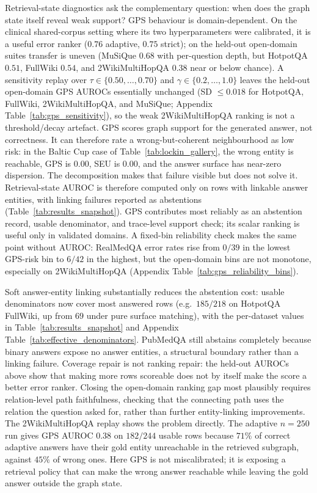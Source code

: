 Retrieval-state diagnostics ask the complementary question: when does the graph
state itself reveal weak support?
GPS behaviour is domain-dependent.
On the clinical shared-corpus setting where its two hyperparameters were
calibrated, it is a useful error ranker ($0.76$ adaptive, $0.75$
strict); on the held-out open-domain suites transfer is uneven (MuSiQue $0.68$
with per-question depth, but HotpotQA $0.51$, FullWiki $0.54$, and
2WikiMultiHopQA $0.38$ near or below chance).
A sensitivity replay over $\tau\in\{0.50,\ldots,0.70\}$ and
$\gamma\in\{0.2,\ldots,1.0\}$ leaves the held-out open-domain GPS AUROCs
essentially unchanged (SD $\leq 0.018$ for HotpotQA, FullWiki,
2WikiMultiHopQA, and MuSiQue; Appendix Table~\ref{tab:gps_sensitivity}), so
the weak 2WikiMultiHopQA ranking is not a threshold/decay artefact.
GPS scores graph support for the generated answer, not correctness.
It can therefore rate a wrong-but-coherent neighbourhood as low risk: in the
Baltic Cup case of Table~\ref{tab:lockin_gallery}, the wrong entity is reachable,
GPS is $0.00$, SEU is $0.00$, and the answer surface has near-zero dispersion.
The decomposition makes that failure visible but does not solve it.
Retrieval-state AUROC is therefore computed only on rows with linkable answer
entities, with linking failures reported as abstentions
(Table~\ref{tab:results_snapshot}). GPS contributes most reliably as an
abstention record, usable denominator, and trace-level support check; its scalar
ranking is useful only in validated domains.
A fixed-bin reliability check makes the same point without AUROC:
RealMedQA error rates rise from $0/39$ in the lowest GPS-risk bin to $6/42$
in the highest, but the open-domain bins are not monotone, especially on
2WikiMultiHopQA (Appendix Table~\ref{tab:gps_reliability_bins}).

Soft answer-entity linking substantially reduces the abstention cost: usable
denominators now cover most answered rows (e.g.\ $185/218$ on HotpotQA
FullWiki, up from $69$ under pure surface matching), with the per-dataset
values in Table~\ref{tab:results_snapshot} and Appendix
Table~\ref{tab:effective_denominators}.
PubMedQA still abstains completely because binary answers expose no answer
entities, a structural boundary rather than a linking failure.
Coverage repair is not ranking repair: the held-out AUROCs above
show that making more rows scoreable does not by itself make the score a
better error ranker.
Closing the open-domain ranking gap most plausibly requires relation-level
path faithfulness, checking that the connecting path uses the relation the
question asked for, rather than further entity-linking improvements.
The 2WikiMultiHopQA replay shows the problem directly.
The adaptive $n=250$ run gives GPS AUROC $0.38$ on $182/244$ usable rows because
$71\%$ of correct adaptive answers have their gold entity unreachable in the
retrieved subgraph, against $45\%$ of wrong ones.
Here GPS is not miscalibrated; it is exposing a retrieval policy that can make
the wrong answer reachable while leaving the gold answer outside the graph state.

